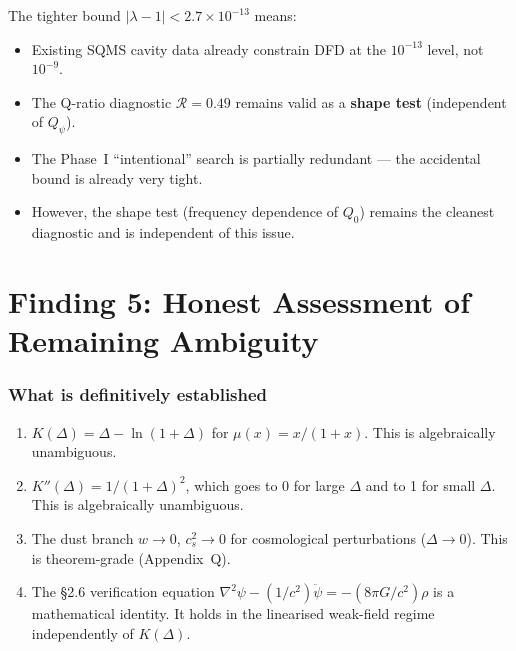 \documentclass[11pt]{article}
\newcommand{\ee}[1]{\times 10^{#1}}
\newcommand{\Qpsi}{Q_\psi}
\theoremstyle{definition}
\theoremstyle{remark}
\begin{document}
The tighter bound $|\lambda-1| < 2.7\ee{-13}$ means:
\begin{itemize}
\item Existing SQMS cavity data already constrain DFD at the
  $10^{-13}$ level, not $10^{-9}$.
\item The Q-ratio diagnostic $\mathcal{R} = 0.49$ remains valid
  as a \textbf{shape test} (independent of $\Qpsi$).
\item The Phase~I ``intentional'' search is partially redundant ---
  the accidental bound is already very tight.
\item However, the shape test (frequency dependence of $Q_0$)
  remains the cleanest diagnostic and is independent of this issue.
\end{itemize}


\part{Finding 5: Honest Assessment of Remaining Ambiguity}
\label{part:honest}


\section{What is definitively established}

\begin{enumerate}
\item $K(\Delta) = \Delta - \ln(1+\Delta)$ for $\mu(x) = x/(1+x)$.
  This is algebraically unambiguous.

\item $K''(\Delta) = 1/(1+\Delta)^2$, which goes to 0 for large $\Delta$
  and to 1 for small $\Delta$. This is algebraically unambiguous.

\item The dust branch $w \to 0$, $c_s^2 \to 0$ for cosmological
  perturbations ($\Delta \to 0$). This is theorem-grade (Appendix~Q).

\item The \S2.6 verification equation $\nabla^2\psi - (1/c^2)\ddot\psi
  = -(8\pi G/c^2)\rho$ is a mathematical identity. It holds in the
  linearised weak-field regime independently of $K(\Delta)$.
\end{enumerate}
\end{document}
